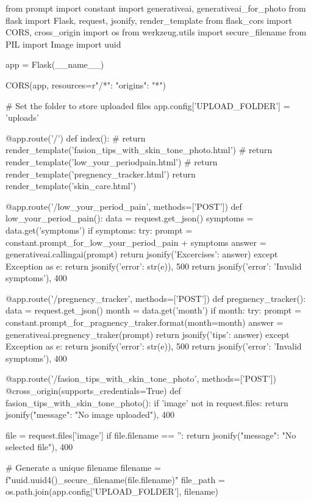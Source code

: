 from prompt import constant
import generativeai, generativeai_for_photo
from flask import Flask, request, jsonify, render_template
from flask_cors import CORS, cross_origin
import os
from werkzeug.utils import secure_filename
from PIL import Image  
import uuid

app = Flask(__name__)

CORS(app, resources={r"/*": {"origins": "*"}})

# Set the folder to store uploaded files
app.config['UPLOAD_FOLDER'] = 'uploads'

@app.route('/')
def index():
    # return render_template('fasion_tips_with_skin_tone_photo.html')
    #  return render_template('low_your_periodpain.html')
    #  return render_template('pregnency_tracker.html')
     return render_template('skin_care.html')

@app.route('/low_your_period_pain', methods=['POST'])
def low_your_period_pain():
    data = request.get_json()  
    symptoms = data.get('symptoms')  
    if symptoms:
        try:
            prompt = constant.prompt_for_low_your_period_pain + symptoms
            answer = generativeai.callingai(prompt)  
            return jsonify({'Excercises': answer})  
        except Exception as e:
            return jsonify({'error': str(e)}), 500  
    return jsonify({'error': 'Invalid symptoms'}), 400

@app.route('/pregnency_tracker', methods=['POST'])
def pregnency_tracker():
    data = request.get_json()  
    month = data.get('month')
    if month:
        try:
            prompt = constant.prompt_for_pragnency_traker.format(month=month)
            answer = generativeai.pregnency_traker(prompt)  
            return jsonify({'tips': answer})  
        except Exception as e:
            return jsonify({'error': str(e)}), 500  
    return jsonify({'error': 'Invalid symptoms'}), 400

@app.route('/fasion_tips_with_skin_tone_photo', methods=['POST'])
@cross_origin(supports_credentials=True)
def fasion_tips_with_skin_tone_photo():
    if 'image' not in request.files:
        return jsonify({"message": "No image uploaded"}), 400

    file = request.files['image']
    if file.filename == '':
        return jsonify({"message": "No selected file"}), 400

    # Generate a unique filename
    filename = f"{uuid.uuid4()}_{secure_filename(file.filename)}"
    file_path = os.path.join(app.config['UPLOAD_FOLDER'], filename)
    
